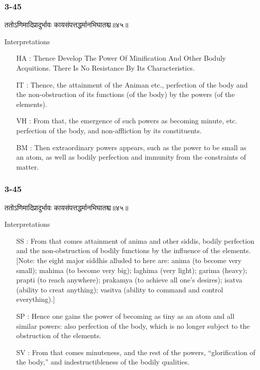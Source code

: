 \begin{frame}[fragile]\frametitle{3-45}
\begin{sanskrit}
ततोऽणिमादिप्रादुर्भावः कायसंपत्तद्धर्मानभिघातश्च॥४५॥
\end{sanskrit}

Interpretations
\begin{itemize}	
\item [HA]: Thence Develop The Power Of Minification And Other Boduly Acquitions. There Is No Resistance By Its Characteristics.
\item [IT]: Thence, the attainment of the Animan etc., perfection of the body and the non-obstruction of its functions (of the body) by the powers (of the elements).
\item [VH]: From that, the emergence of such powers as becoming minute, etc. perfection of the body, and non-affliction by its constituents.	
\item [BM]: Then extraordinary powers appears, such as the power to be small as an atom, as well as bodily perfection and immunity from the constraints of matter.
\end{itemize}
\end{frame}

\begin{frame}[fragile]\frametitle{3-45}
\begin{sanskrit}
ततोऽणिमादिप्रादुर्भावः कायसंपत्तद्धर्मानभिघातश्च॥४५॥
\end{sanskrit}

Interpretations
\begin{itemize}	
\item [SS]: From that comes attainment of anima and other siddis, bodily perfection and the non-obstruction of bodily functions by the influence of the elements. [Note: the eight major siddhis alluded to here are: anima (to become very small); mahima (to become very big); laghima (very light); garima (heavy); prapti (to reach anywhere); prakamya (to achieve all one’s desires); isatva (ability to creat anything); vasitva (ability to command and control everything).]
\item [SP]: Hence one gains the power of becoming as tiny as an atom and all similar powers: also perfection of the body, which is no longer subject to the obstruction of the elements.
\item [SV]: From that comes minuteness, and the rest of the powers, “glorification of the body,” and indestructibleness of the bodily qualities. 
\end{itemize}
\end{frame}

